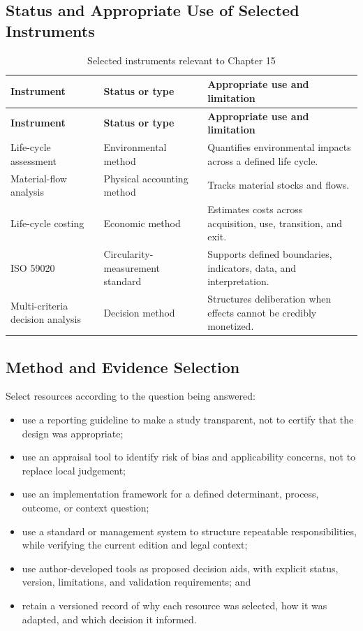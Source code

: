 \subsection{Status and Appropriate Use of Selected Instruments}
\begin{longtable}{@{}p{}p{}p{}@{}}
\caption{Selected instruments relevant to Chapter 15}
\label{tab:comp-ch15-instrument-status}\\
\toprule
\textbf{Instrument} & \textbf{Status or type} & \textbf{Appropriate use and limitation} \\
\midrule
\endfirsthead
\toprule
\textbf{Instrument} & \textbf{Status or type} & \textbf{Appropriate use and limitation} \\
\midrule
\endhead
\bottomrule
\endlastfoot
Life-cycle assessment & Environmental method & Quantifies environmental impacts across a defined life cycle. \\
Material-flow analysis & Physical accounting method & Tracks material stocks and flows. \\
Life-cycle costing & Economic method & Estimates costs across acquisition, use, transition, and exit. \\
ISO 59020 & Circularity-measurement standard & Supports defined boundaries, indicators, data, and interpretation. \\
Multi-criteria decision analysis & Decision method & Structures deliberation when effects cannot be credibly monetized. \\
\end{longtable}

\subsection{Method and Evidence Selection}
Select resources according to the question being answered:
\begin{itemize}
 \item use a reporting guideline to make a study transparent, not to certify that the design was appropriate;
 \item use an appraisal tool to identify risk of bias and applicability concerns, not to replace local judgement;
 \item use an implementation framework for a defined determinant, process, outcome, or context question;
 \item use a standard or management system to structure repeatable responsibilities, while verifying the current edition and legal context;
 \item use author-developed tools as proposed decision aids, with explicit status, version, limitations, and validation requirements; and
 \item retain a versioned record of why each resource was selected, how it was adapted, and which decision it informed.
\end{itemize}

